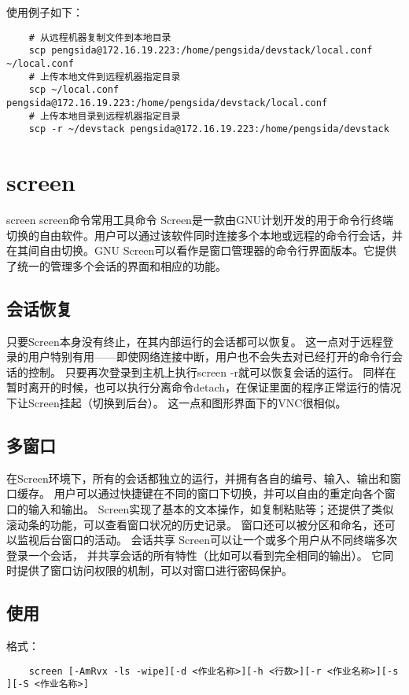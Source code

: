 \documentclass[a4paper,left=2.5cm,right=2.5cm,11pt]{article}
\begin{document}
	使用例子如下：
	\begin{lstlisting}
	# 从远程机器复制文件到本地目录
	scp pengsida@172.16.19.223:/home/pengsida/devstack/local.conf ~/local.conf
	# 上传本地文件到远程机器指定目录
	scp ~/local.conf pengsida@172.16.19.223:/home/pengsida/devstack/local.conf
	# 上传本地目录到远程机器指定目录
	scp -r ~/devstack pengsida@172.16.19.223:/home/pengsida/devstack
	\end{lstlisting}

\section{screen}
	screen screen命令常用工具命令 Screen是一款由GNU计划开发的用于命令行终端切换的自由软件。用户可以通过该软件同时连接多个本地或远程的命令行会话，并在其间自由切换。GNU Screen可以看作是窗口管理器的命令行界面版本。它提供了统一的管理多个会话的界面和相应的功能。

\subsection{会话恢复}
	只要Screen本身没有终止，在其内部运行的会话都可以恢复。
	这一点对于远程登录的用户特别有用——即使网络连接中断，用户也不会失去对已经打开的命令行会话的控制。
	只要再次登录到主机上执行screen -r就可以恢复会话的运行。
	同样在暂时离开的时候，也可以执行分离命令detach，在保证里面的程序正常运行的情况下让Screen挂起（切换到后台）。
	这一点和图形界面下的VNC很相似。

\subsection{多窗口}
	在Screen环境下，所有的会话都独立的运行，并拥有各自的编号、输入、输出和窗口缓存。
	用户可以通过快捷键在不同的窗口下切换，并可以自由的重定向各个窗口的输入和输出。
	Screen实现了基本的文本操作，如复制粘贴等；还提供了类似滚动条的功能，可以查看窗口状况的历史记录。
	窗口还可以被分区和命名，还可以监视后台窗口的活动。 
	会话共享 Screen可以让一个或多个用户从不同终端多次登录一个会话，
	并共享会话的所有特性（比如可以看到完全相同的输出）。
	它同时提供了窗口访问权限的机制，可以对窗口进行密码保护。

\subsection{使用}
	格式：
	\begin{lstlisting}
	screen [-AmRvx -ls -wipe][-d <作业名称>][-h <行数>][-r <作业名称>][-s ][-S <作业名称>]
	\end{lstlisting}
\end{document}
